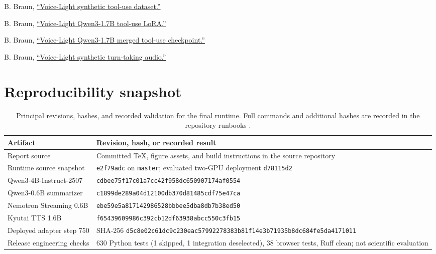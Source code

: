 \documentclass[10pt,twocolumn]{article}
\newcommand{\code}[1]{\texttt{#1}}
\begin{document}
\begin{thebibliography}{99}
B. Braun, \href{https://huggingface.co/datasets/BertilBraun/voice-light-tool-use-synthetic}
{``Voice-Light synthetic tool-use dataset.''}

B. Braun, \href{https://huggingface.co/BertilBraun/qwen3-1.7b-voice-light-tool-use-lora}
{``Voice-Light Qwen3-1.7B tool-use LoRA.''}

B. Braun, \href{https://huggingface.co/BertilBraun/qwen3-1.7b-voice-light-tool-use-merged}
{``Voice-Light Qwen3-1.7B merged tool-use checkpoint.''}

B. Braun, \href{https://huggingface.co/datasets/BertilBraun/voice-light-synthetic-audio}
{``Voice-Light synthetic turn-taking audio.''}
\end{thebibliography}
\endgroup

\clearpage
\onecolumn
\appendix
\section{Reproducibility snapshot}

\begin{table}[H]
\centering
\caption{Principal revisions, hashes, and recorded validation for the final runtime. Full commands
and additional hashes are recorded in the repository runbooks \cite{voice-light}.}
\footnotesize
\begin{tabularx}{\textwidth}{@{}p{4.1cm}X@{}}
\toprule
Artifact & Revision, hash, or recorded result \\
\midrule
Report source & Committed TeX, figure assets, and build instructions in the source repository \\
Runtime source snapshot & \code{e2f79adc} on \code{master}; evaluated two-GPU deployment \code{d78115d2} \\
Qwen3-4B-Instruct-2507 & \nolinkurl{cdbee75f17c01a7cc42f958dc650907174af0554} \\
Qwen3-0.6B summarizer & \nolinkurl{c1899de289a04d12100db370d81485cdf75e47ca} \\
Nemotron Streaming 0.6B & \nolinkurl{ebe59e5a817142986528bbbee5dba8db7b38ed50} \\
Kyutai TTS 1.6B & \nolinkurl{f65439609986c392cb12df63938abcc550c3fb15} \\
Deployed adapter step 750 & SHA-256 \nolinkurl{d5c8e02c61dc9c230eac57992278383b81f14e3b71935b8dc684fe5da4171011} \\
Release engineering checks & 630 Python tests (1 skipped, 1 integration deselected), 38 browser tests, Ruff clean; not scientific evaluation \\
\bottomrule
\end{tabularx}
\label{tab:repro}
\end{table}
\end{document}
